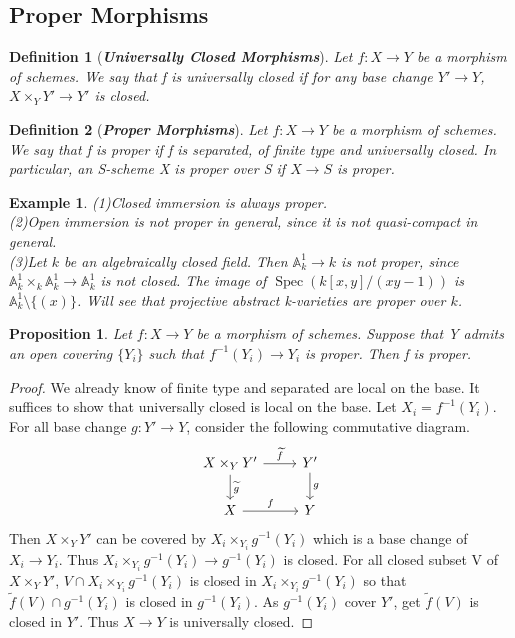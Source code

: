 \documentclass{ctexart}
\newtheorem{definition}{Definition}[section]
\newtheorem{proposition}{Proposition}[section]
\newtheorem{example}{Example}[section]
\newcommand{\spec}{\operatorname{Spec}}
\begin{document}
\subsection{Proper Morphisms}
\begin{definition}[\textbf{\emph{Universally Closed Morphisms}}]
    Let $f: X \longrightarrow Y$ be a morphism of schemes.
    We say that f is universally closed if for any base change $Y' \longrightarrow Y$, $X \times_{Y} Y' \longrightarrow Y'$ is closed.
\end{definition}
\begin{definition}[\textbf{\emph{Proper Morphisms}}]
    Let $f: X \longrightarrow Y$ be a morphism of schemes.
    We say that f is proper if f is separated, of finite type and universally closed.
    In particular, an S-scheme X is proper over S if $X \longrightarrow S$ is proper.
\end{definition}
\begin{example}
    (1)Closed immersion is always proper. \\
    (2)Open immersion is not proper in general, since it is not quasi-compact in general. \\
    (3)Let $k$ be an algebraically closed field.
    Then $\mathbb{A}_{k}^{1} \longrightarrow k$ is not proper, since $\mathbb{A}_{k}^{1} \times_{k} \mathbb{A}_{k}^{1} \longrightarrow \mathbb{A}_{k}^{1}$ is not closed.
    The image of $\spec(k[x, y]/(xy - 1))$ is $\mathbb{A}_{k}^{1} \setminus \{(x)\}$.
    Will see that projective abstract k-varieties are proper over $k$.
\end{example}
\begin{proposition}
    Let $f: X \longrightarrow Y$ be a morphism of schemes.
    Suppose that Y admits an open covering $\{Y_{i}\}$ such that $f^{-1}(Y_{i}) \longrightarrow Y_{i}$ is proper.
    Then f is proper.
    \label{Proposition 4.7}
\end{proposition}
\begin{proof}
    We already know of finite type and separated are local on the base.
    It suffices to show that universally closed is local on the base.
    Let $X_{i} = f^{-1}(Y_{i})$.
    For all base change $g: Y' \longrightarrow Y$, consider the following commutative diagram. 
    \begin{equation*}
        \begin{tikzcd}
            X \times_{Y} Y' \arrow[r, "\widetilde{f}"] \arrow[d, "\widetilde{g}"] &
            Y' \arrow[d, "g"] \\
            X \arrow[r, "f"] &
            Y
        \end{tikzcd}
    \end{equation*}
    Then $X \times_{Y} Y'$ can be covered by $X_{i} \times_{Y_{i}} g^{-1}(Y_{i})$ which is a base change of $X_{i} \longrightarrow Y_{i}$.
    Thus $X_{i} \times_{Y_{i}} g^{-1}(Y_{i}) \longrightarrow g^{-1}(Y_{i})$ is closed.
    For all closed subset V of $X \times_{Y} Y'$, $V \cap X_{i} \times_{Y_{i}} g^{-1}(Y_{i})$ is closed in $X_{i} \times_{Y_{i}} g^{-1}(Y_{i})$ so that $\widetilde{f}(V) \cap g^{-1}(Y_{i})$ is closed in $g^{-1}(Y_{i})$.
    As $g^{-1}(Y_{i})$ cover $Y'$, get $\widetilde{f}(V)$ is closed in $Y'$.
    Thus $X \longrightarrow Y$ is universally closed. 
\end{proof}
\end{document}
